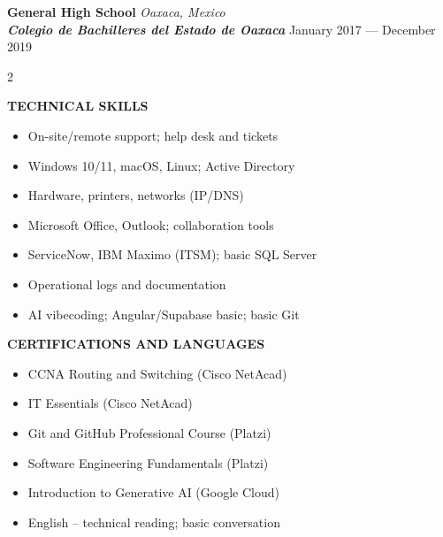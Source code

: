 \documentclass[10pt,letterpaper]{article}
\newcommand{\entry}[4]{
  \begin{minipage}[t]{\linewidth}
    \textbf{#1} \hfill \textit{#2} \\
    \textbf{\textit{#3}} \hfill #4
  \end{minipage}
}
\begin{document}
\entry
{General High School}
{Oaxaca, Mexico}
{Colegio de Bachilleres del Estado de Oaxaca}
{January 2017 --- December 2019}

\begin{multicols}{2}

	\textbf{\MakeUppercase{Technical Skills}}
	\begin{itemize}
		\item On-site/remote support; help desk and tickets
		\item Windows 10/11, macOS, Linux; Active Directory
		\item Hardware, printers, networks (IP/DNS)
		\item Microsoft Office, Outlook; collaboration tools
		\item ServiceNow, IBM Maximo (ITSM); basic SQL Server
		\item Operational logs and documentation
		\item AI vibecoding; Angular/Supabase basic; basic Git
	\end{itemize}

	\columnbreak

	\textbf{\MakeUppercase{Certifications and Languages}}
	\begin{itemize}
		\item CCNA Routing and Switching (Cisco NetAcad)
		\item IT Essentials (Cisco NetAcad)
		\item Git and GitHub Professional Course (Platzi)
		\item Software Engineering Fundamentals (Platzi)
		\item Introduction to Generative AI (Google Cloud)
		\item English -- technical reading; basic conversation
	\end{itemize}

\end{multicols}
\end{document}
